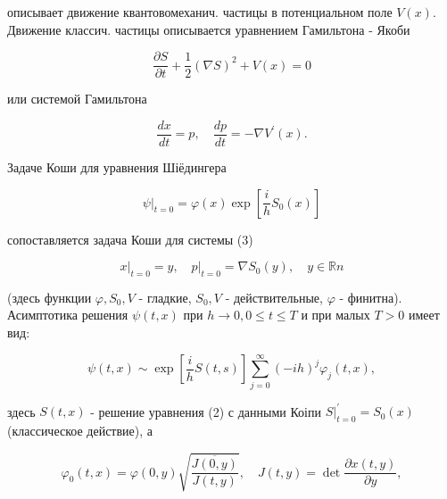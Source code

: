 \documentclass[10pt]{article}
\begin{document}
описывает движение квантовомеханич. частицы в потенциальном поле $V(x)$. Движение классич. частицы описывается уравнением Гамильтона - Якоби



\[

\frac{\partial S}{\partial t}+\frac{1}{2}(\nabla S)^{2}+V(x)=0

\]



или системой Гамильтона



\[

\frac{d x}{d t}=p, \quad \frac{d p}{d t}=-\nabla V^{\prime}(x) .

\]



Задаче Коши для уравнения Шіёдингера



\[

\left.\psi\right|_{t=0}=\varphi(x) \exp \left[\frac{i}{h} S_{0}(x)\right]

\]



сопоставляется задача Коши для системы (3)



\[

\left.x\right|_{t=0}=y,\left.\quad p\right|_{t=0}=\nabla S_{0}(y), \quad y \in \mathbb{R} n

\]



(здесь функции $\varphi, S_{0}, V$ - гладкие, $S_{0}, V$ - действительные, $\varphi$ - финитна). Асимптотика решения $\psi(t, x)$ при $h \rightarrow 0,0 \leqslant t \leqslant T$ и при малых $T>0$ имеет вид:



\[

\psi(t, x) \sim \exp \left[\frac{i}{h} S(t, s)\right] \sum_{j=0}^{\infty}(-i h)^{j} \varphi_{j}(t, x),

\]



здесь $S(t, x)$ - решение уравнения (2) с данными Коіпи $\left.S\right|_{t=0} ^{\prime}=S_{0}(x)$ (классическое действие), а



\[

\varphi_{0}(t, x)=\varphi(0, y) \sqrt{\frac{\overline{J(0, y)}}{J(t, y)}}, \quad J(t, y)=\operatorname{det} \frac{\partial x(t, y)}{\partial y},

\]
\end{document}
